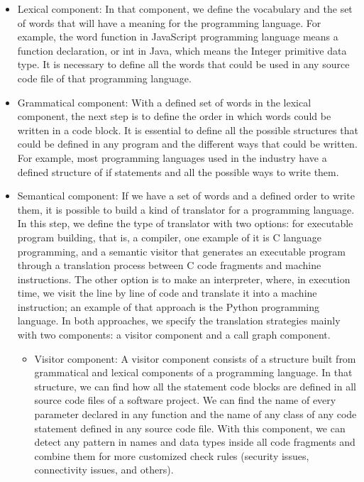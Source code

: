 \begin{itemize}
	\item Lexical component: In that component, we define the vocabulary and the set of words that will have a meaning for the programming language. For example, the word function in JavaScript programming language means a function declaration, or int in Java, which means the Integer primitive data type. It is necessary to define all the words that could be used in any source code file of that programming language.
	\item Grammatical component: With a defined set of words in the lexical component, the next step is to define the order in which words could be written in a code block. It is essential to define all the possible structures that could be defined in any program and the different ways that could be written. For example, most programming languages used in the industry have a defined structure of if statements and all the possible ways to write them.
	\item Semantical component: If we have a set of words and a defined order to write them, it is possible to build a kind of translator for a programming language. In this step, we define the type of translator with two options: for executable program building, that is, a compiler, one example of it is C language programming, and a semantic visitor that generates an executable program through a translation process between C code fragments and machine instructions. The other option is to make an interpreter, where, in execution time, we visit the line by line of code and translate it into a machine instruction; an example of that approach is the Python programming language. In both approaches, we specify the translation strategies mainly with two components: a visitor component and a call graph component.
		\begin{itemize}
			\item Visitor component: A visitor component consists of a structure built from grammatical and lexical components of a programming language. In that structure, we can find how all the statement code blocks are defined in all source code files of a software project. We can find the name of every parameter declared in any function and the name of any class of any code statement defined in any source code file. With this component, we can detect any pattern in names and data types inside all code fragments and combine them for more customized check rules (security issues, connectivity issues, and others).		
			\begin{figure}

\end{figure}
\end{itemize}
\end{itemize}
